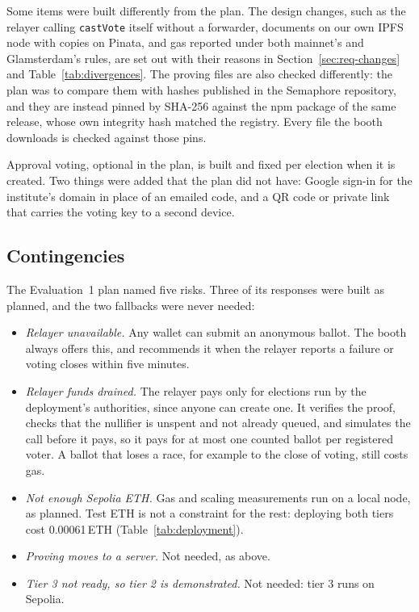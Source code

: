 Some items were built differently from the plan. The design changes, such as
the relayer calling \texttt{castVote} itself without a forwarder, documents on
our own IPFS node with copies on Pinata, and gas reported under both mainnet's
and Glamsterdam's rules, are set out with their reasons in
Section~\ref{sec:req-changes} and Table~\ref{tab:divergences}. The proving files
are also checked differently: the plan was to compare them with hashes
published in the Semaphore repository, and they are instead pinned by SHA-256
against the npm package of the same release, whose own integrity hash matched
the registry. Every file the booth downloads is checked against those pins.

Approval voting, optional in the plan, is built and fixed per election when it
is created. Two things were added that the plan did not have: Google sign-in
for the institute's domain in place of an emailed code, and a QR code or
private link that carries the voting key to a second device.

\subsection{Contingencies}

The Evaluation~1 plan named five risks. Three of its responses were built as
planned, and the two fallbacks were never needed:

\begin{itemize}
  \item \emph{Relayer unavailable.} Any wallet can submit an anonymous
        ballot. The booth always offers this, and recommends it when the relayer
        reports a failure or voting closes within five minutes.
  \item \emph{Relayer funds drained.} The relayer pays only for elections run
        by the deployment's authorities, since anyone can create one. It
        verifies the proof, checks that the nullifier is unspent and not already
        queued, and simulates the call before it pays, so it pays for at most
        one counted ballot per registered voter. A ballot that loses a race, for example to the close
        of voting, still costs gas.
  \item \emph{Not enough Sepolia ETH.} Gas and scaling measurements run on a
        local node, as planned. Test ETH is not a constraint for the rest:
        deploying both tiers cost 0.00061\,ETH (Table~\ref{tab:deployment}).
  \item \emph{Proving moves to a server.} Not needed, as above.
  \item \emph{Tier 3 not ready, so tier 2 is demonstrated.} Not needed: tier 3
        runs on Sepolia.
\end{itemize}

